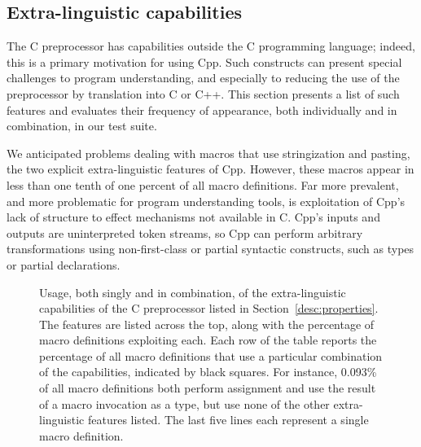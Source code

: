 \documentclass[10pt]{article}
\newcommand{\captionsmall}[1]{\caption[]{\small #1}}
\begin{document}





\subsection{Extra-linguistic capabilities}
\label{sec:extra-linguistic}

The C preprocessor has capabilities outside the C programming language;
indeed, this is a primary motivation for using Cpp.  Such constructs can
present special challenges to program understanding, and especially to
reducing the use of the preprocessor by translation into C or C++.  This
section
presents a list of such features and evaluates their frequency of
appearance, both individually and in combination, in our test suite.

We anticipated problems dealing with macros that use stringization and
pasting, the two explicit extra-linguistic features of Cpp.  However, these
macros appear in less than one tenth of one percent of all macro
definitions.  Far more prevalent, and more problematic for program
understanding tools, is exploitation of Cpp's lack of structure to effect
mechanisms not available in C\@.  Cpp's inputs and outputs are
uninterpreted token streams, so Cpp can perform arbitrary transformations
using non-first-class or partial syntactic constructs, such as types or
partial declarations.

\begin{figure}
  {\small\centerline{}}
  
  \captionsmall{Usage, both singly and in
    combination, of the extra-linguistic capabilities of the C
    preprocessor listed in Section~\ref{desc:properties}.  The features are
    listed across the top, along with the percentage of macro definitions
    exploiting each.  Each row of the table reports the percentage of all
    macro definitions that use a particular combination of the
    capabilities, indicated by black squares.  For instance, 0.093\% of all
    macro definitions both perform assignment and use the result of a macro
    invocation as a type, but use none of the other extra-linguistic
    features listed.  The last five lines each represent a single macro
    definition.}
  \label{fig:subset-properties}
\end{figure}
\end{document}
